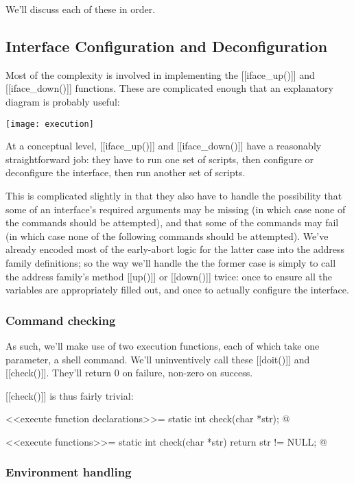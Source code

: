 \documentclass{article}
\begin{document}
We'll discuss each of these in order.

\subsection{Interface Configuration and Deconfiguration}

Most of the complexity is involved in implementing the [[iface_up()]] and
[[iface_down()]] functions. These are complicated enough that an explanatory
diagram is probably useful:

\begin{center}
\texttt{[image: execution]}
\end{center}

At a conceptual level, [[iface_up()]] and [[iface_down()]] have a
reasonably straightforward job: they have to run one set of scripts,
then configure or deconfigure the interface, then run another set of
scripts.

This is complicated slightly in that they also have to handle the
possibility that some of an interface's required arguments may be missing
(in which case none of the commands should be attempted), and that some
of the commands may fail (in which case none of the following commands
should be attempted). We've already encoded most of the early-abort
logic for the latter case into the address family definitions; so the way
we'll handle the the former case is simply to call the address family's
method [[up()]] or [[down()]] twice: once to ensure all the variables are
appropriately filled out, and once to actually configure the interface.

\subsubsection{Command checking}

As such, we'll make use of two execution functions, each of which take
one parameter, a shell command. We'll uninventively call these [[doit()]]
and [[check()]]. They'll return 0 on failure, non-zero on success.

[[check()]] is thus fairly trivial:

<<execute function declarations>>=
static int check(char *str);
@

<<execute functions>>=
static int check(char *str) {
	return str != NULL;
}
@ 

\subsubsection{Environment handling}
\end{document}
